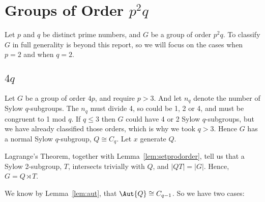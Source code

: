 \section{Groups of Order \(p^2q\)}
Let \(p\) and \(q\) be distinct prime numbers, and \(G\) be a group of order \(p^2q\).
To classify \(G\) in full generality is beyond this report, so we will focus on the cases when \(p = 2\) and when \(q =
2\).

\subsection{\(4q\)}
Let \(G\) be a group of order \(4p\), and require \(p > 3\).
And let \(n_q\) denote the number of Sylow \(q\)-subgroups.
The \(n_q\) must divide 4, so could be 1, 2 or 4, and must be congruent to 1 mod \(q\).
If \(q \leqslant 3\) then \(G\) could have 4 or 2 Sylow \(q\)-subgroups, but we have already classified those orders,
which is why we took \(q > 3\).
Hence \(G\) has a normal Sylow \(q\)-subgroup, \(Q \cong C_q\).
Let \(x\) generate \(Q\).

Lagrange's Theorem, together with Lemma~\ref{lem:setprodorder}, tell us that a Sylow 2-subgroup, \(T\), intersects
trivially with \(Q\), and \(|QT| = |G|\).
Hence, \(G = Q \rtimes T\).

We know by Lemma~\ref{lem:aut}, that \(\Aut{Q} \cong C_{q-1}\).
So we have two cases:

